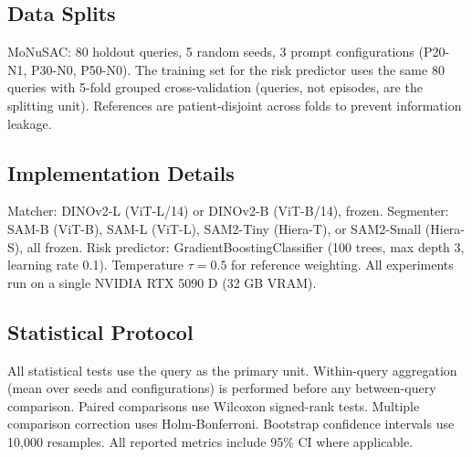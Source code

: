 \documentclass[11pt]{article}
\begin{document}
\subsection{Data Splits}

MoNuSAC: 80 holdout queries, 5 random seeds, 3 prompt configurations
(P20-N1, P30-N0, P50-N0). The training set for the risk predictor uses the
same 80 queries with 5-fold grouped cross-validation (queries, not
episodes, are the splitting unit). References are patient-disjoint across
folds to prevent information leakage.

\subsection{Implementation Details}

Matcher: DINOv2-L (ViT-L/14) or DINOv2-B (ViT-B/14), frozen. Segmenter:
SAM-B (ViT-B), SAM-L (ViT-L), SAM2-Tiny (Hiera-T), or SAM2-Small (Hiera-S),
all frozen. Risk predictor: GradientBoostingClassifier (100 trees, max depth
3, learning rate 0.1). Temperature $\tau = 0.5$ for reference weighting. All
experiments run on a single NVIDIA RTX 5090 D (32 GB VRAM).

\subsection{Statistical Protocol}

All statistical tests use the query as the primary unit. Within-query
aggregation (mean over seeds and configurations) is performed before any
between-query comparison. Paired comparisons use Wilcoxon signed-rank tests.
Multiple comparison correction uses Holm-Bonferroni. Bootstrap confidence
intervals use 10,000 resamples. All reported metrics include 95\% CI where
applicable.

\end{document}
